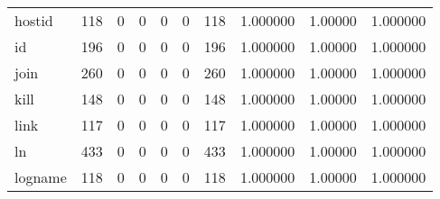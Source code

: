 \begin{tabular}{lrrrrrrrrr}
hostid    &                    118 &                                  0 &                                 0 &                                0 &                                 0 &                             118 &                                1.000000 &                                1.00000 &                             1.000000 \\
id        &                    196 &                                  0 &                                 0 &                                0 &                                 0 &                             196 &                                1.000000 &                                1.00000 &                             1.000000 \\
join      &                    260 &                                  0 &                                 0 &                                0 &                                 0 &                             260 &                                1.000000 &                                1.00000 &                             1.000000 \\
kill      &                    148 &                                  0 &                                 0 &                                0 &                                 0 &                             148 &                                1.000000 &                                1.00000 &                             1.000000 \\
link      &                    117 &                                  0 &                                 0 &                                0 &                                 0 &                             117 &                                1.000000 &                                1.00000 &                             1.000000 \\
ln        &                    433 &                                  0 &                                 0 &                                0 &                                 0 &                             433 &                                1.000000 &                                1.00000 &                             1.000000 \\
logname   &                    118 &                                  0 &                                 0 &                                0 &                                 0 &                             118 &                                1.000000 &                                1.00000 &                             1.000000 \\

\end{tabular}
